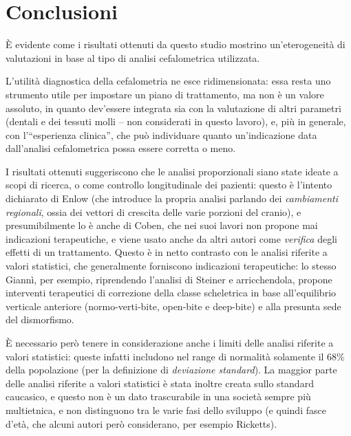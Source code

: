 \chapter{Conclusioni}

È evidente come i risultati ottenuti da questo studio mostrino un'eterogeneità di valutazioni in base al tipo di analisi cefalometrica utilizzata.

L'utilità diagnostica della cefalometria ne esce ridimensionata: essa resta uno strumento utile per impostare un piano di trattamento, ma non è un valore assoluto, in quanto dev'essere integrata sia con la valutazione di altri parametri (dentali e dei tessuti molli -- non considerati in questo lavoro), e, più in generale, con l'``esperienza clinica'', che può individuare quanto un'indicazione data dall'analisi cefalometrica possa essere corretta o meno.

I risultati ottenuti suggeriscono che le analisi proporzionali siano state ideate a scopi di ricerca, o come controllo longitudinale dei pazienti: questo è l'intento dichiarato di Enlow (che introduce la propria analisi parlando dei \emph{cambiamenti regionali}, ossia dei vettori di crescita delle varie porzioni del cranio), e presumibilmente lo è anche di Coben, che nei suoi lavori non propone mai indicazioni terapeutiche, e viene usato anche da altri autori come \emph{verifica} degli effetti di un trattamento. Questo è in netto contrasto con le analisi riferite a valori statistici, che generalmente forniscono indicazioni terapeutiche: lo stesso Giannì, per esempio, riprendendo l'analisi di Steiner e arricchendola, propone interventi terapeutici di correzione della classe scheletrica in base all'equilibrio verticale anteriore (normo-verti-bite, open-bite e deep-bite) e alla presunta sede del dismorfismo.

È necessario però tenere in considerazione anche i limiti delle analisi riferite a valori statistici: queste infatti includono nel range di normalità solamente il $68\%$ della popolazione (per la definizione di \emph{deviazione standard}). La maggior parte delle analisi riferite a valori statistici è stata inoltre creata sullo standard caucasico, e questo non è un dato trascurabile in una società sempre più multietnica, e non distinguono tra le varie fasi dello sviluppo (e quindi fasce d'età, che alcuni autori però considerano, per esempio Ricketts).


